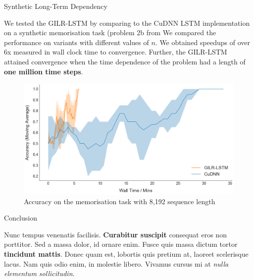 \documentclass[final]{beamer}
\newlength{\onecolwid}
\begin{document}
\begin{frame}[t]
\begin{columns}[t]
\begin{column}{\onecolwid} %

\begin{block}{Synthetic Long-Term Dependency}

  We tested the GILR-LSTM by comparing to the CuDNN LSTM implementation
  on a synthetic memorisation task (problem 2b from %
  We compared the performance on variants with different values of
  \(n\).  We obtained speedups of over 6x measured in wall clock time to
  convergence.  Further, the GILR-LSTM attained convergence
  when the time dependence of the problem had a length of \textbf{one  million time steps}.

 \vspace{2em}
\begin{figure}
\includegraphics[width=1.0\linewidth]{8k_for_poster.png}
\caption{Accuracy on the memorisation task with 8,192 sequence length}
\end{figure}

\end{block}



\begin{block}{Conclusion}

Nunc tempus venenatis facilisis. \textbf{Curabitur suscipit} consequat eros non porttitor. Sed a massa dolor, id ornare enim. Fusce quis massa dictum tortor \textbf{tincidunt mattis}. Donec quam est, lobortis quis pretium at, laoreet scelerisque lacus. Nam quis odio enim, in molestie libero. Vivamus cursus mi at \textit{nulla elementum sollicitudin}.

\end{block}



\end{column}
\end{columns}
\end{frame}
\end{document}
